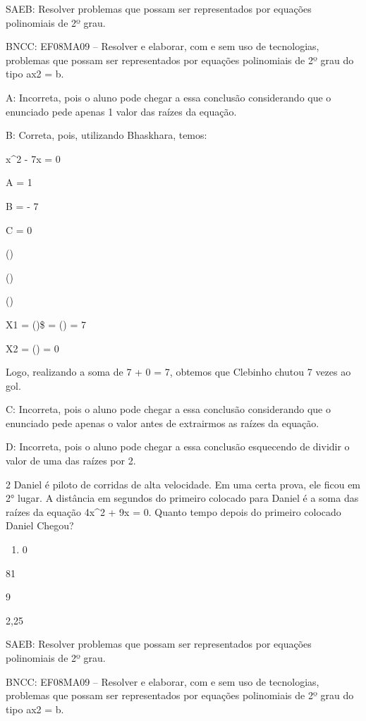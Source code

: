 {SAEB: Resolver problemas que possam ser representados por equações
polinomiais de 2º grau.

BNCC: EF08MA09 -- Resolver e elaborar, com e sem uso de tecnologias,
problemas que possam ser representados por equações polinomiais de 2º
grau do tipo ax2 = b.

A: Incorreta, pois o aluno pode chegar a essa conclusão considerando que
o enunciado pede apenas 1 valor das raízes da equação.

B: Correta, pois, utilizando Bhaskhara, temos:

x^2 - 7x = 0

A = 1

B = - 7

C = 0

()

()

()

X1 = ()\$ = () = 7

X2 = () = 0

Logo, realizando a soma de 7 + 0 = 7, obtemos que Clebinho chutou 7
vezes ao gol.

C: Incorreta, pois o aluno pode chegar a essa conclusão considerando que
o enunciado pede apenas o valor antes de extrairmos as raízes da
equação.

D: Incorreta, pois o aluno pode chegar a essa conclusão esquecendo de
dividir o valor de uma das raízes por 2.

\num{2} Daniel é piloto de corridas de alta velocidade. Em uma certa prova,
ele ficou em 2° lugar. A distância em segundos do primeiro colocado para
Daniel é a soma das raízes da equação 4x^2 + 9x = 0. Quanto tempo depois
do primeiro colocado Daniel Chegou?

\begin{enumerate}
\def\labelenumi{\alph{enumi})}
\tightlist
\item
  0
\end{enumerate}
\item 81
\item 9
\item 2,25

SAEB: Resolver problemas que possam ser representados por equações
polinomiais de 2º grau.

BNCC: EF08MA09 -- Resolver e elaborar, com e sem uso de tecnologias,
problemas que possam ser representados por equações polinomiais de 2º
grau do tipo ax2 = b.

}
